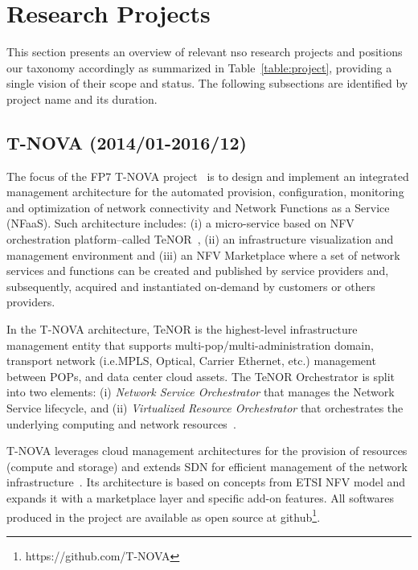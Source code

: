 \section{Research Projects}
\label{sec:project}

This section presents an overview of relevant \gls{nso} research projects and positions our taxonomy accordingly as summarized in Table~\ref{table:project}, providing a single vision of their scope and status. 
The following subsections are identified by project name and its duration.

\subsection{T-NOVA (2014/01-2016/12)}

The focus of the FP7 T-NOVA project~\cite{FP7projectT-NOVAT-NOVAInfrastructures} is to design and implement an integrated management architecture for the automated provision, configuration, monitoring and optimization of network connectivity and Network Functions as a Service (NFaaS). Such architecture includes: (i) a micro-service based on NFV orchestration platform--called TeNOR~\cite{7502419}, (ii) an infrastructure visualization and management environment and (iii) an NFV Marketplace where a set of network services and functions can be created and published by service providers and, subsequently, acquired and instantiated on-demand by customers
 or others providers.

In the T-NOVA architecture, TeNOR is the highest-level infrastructure management entity that supports multi-pop/multi-administration domain, transport network (i.e.MPLS, Optical, Carrier    Ethernet, etc.) management between POPs, and data center cloud assets. The TeNOR Orchestrator is split into two elements: (i) \textit{Network Service Orchestrator} that manages the Network Service lifecycle, and (ii) \textit{Virtualized Resource Orchestrator} that orchestrates the underlying computing and network resources~\cite{Kourtis2017T-NOVA:Infrastructures}. 

T-NOVA leverages cloud management architectures for the provision of resources (compute and storage) and extends SDN for efficient management of the network infrastructure~\cite{T-NOVAD2.1:Requirements}. Its architecture is based on concepts from ETSI NFV model and expands it with a marketplace layer and specific add-on features. All softwares produced in the project are available as open source at github\footnote{https://github.com/T-NOVA}.

